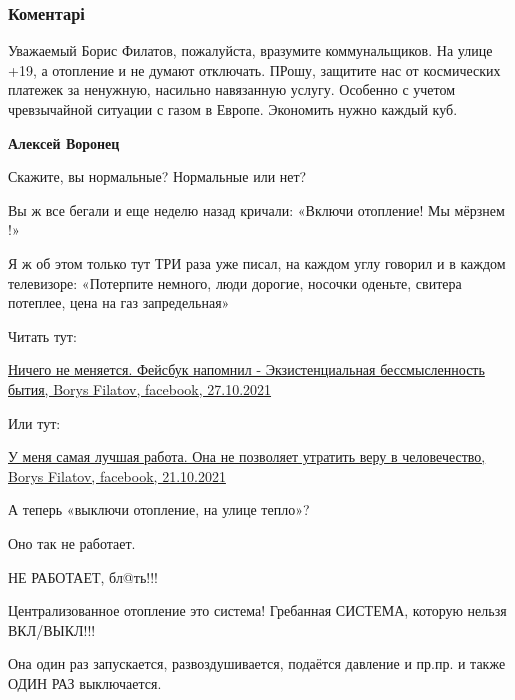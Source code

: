  
 
 
 
 
\subsubsection{Коментарі}

\begin{itemize} %

Уважаемый Борис Филатов, пожалуйста, вразумите коммунальщиков. На улице +19, а
отопление и не думают отключать. ПРошу, защитите нас от космических платежек за
ненужную, насильно навязанную услугу. Особенно с учетом чревзычайной ситуации с
газом в Европе. Экономить нужно каждый куб.

\begin{itemize} %
\textbf{Алексей Воронец} 

Скажите, вы нормальные? Нормальные или нет?

Вы ж все бегали и еще неделю назад кричали: «Включи отопление! Мы мёрзнем !»

Я ж об этом только тут ТРИ раза уже писал, на каждом углу говорил и в каждом
телевизоре: «Потерпите немного, люди дорогие, носочки оденьте, свитера
потеплее, цена на газ запредельная»

Читать тут: 

\href{https://www.facebook.com/100002157183088/posts/4479461452135717/?d=n}{%
Ничего не меняется. Фейсбук напомнил - Экзистенциальная бессмысленность бытия, Borys Filatov, facebook, %
27.10.2021%
}

Или тут: 

\href{https://www.facebook.com/100002157183088/posts/4459358090812720/?d=n}{%
У меня самая лучшая работа. Она не позволяет утратить веру в человечество, %
Borys Filatov, facebook, %
21.10.2021%
}

А теперь «выключи отопление, на улице тепло»?

Оно так не работает.

НЕ РАБОТАЕТ, бл@ть!!!

Централизованное отопление это система! Гребанная СИСТЕМА, которую нельзя
ВКЛ/ВЫКЛ!!!

Она один раз запускается, развоздушивается, подаётся давление и пр.пр. и также
ОДИН РАЗ выключается.


\end{itemize}
\end{itemize}
